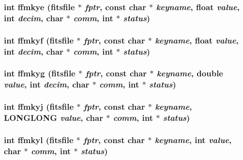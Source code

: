 \subsubsection{\setlength{\rightskip}{0pt plus 5cm}int ffmkye (\bf{fitsfile} $\ast$ {\em fptr}, const char $\ast$ {\em keyname}, float {\em value}, int {\em decim}, char $\ast$ {\em comm}, int $\ast$ {\em status})}\label{fitsio_8h_84fa2097111d3805d61b197d7a00ee78}


\subsubsection{\setlength{\rightskip}{0pt plus 5cm}int ffmkyf (\bf{fitsfile} $\ast$ {\em fptr}, const char $\ast$ {\em keyname}, float {\em value}, int {\em decim}, char $\ast$ {\em comm}, int $\ast$ {\em status})}\label{fitsio_8h_a6e96904c21b62c82a78f38a345e7b39}


\subsubsection{\setlength{\rightskip}{0pt plus 5cm}int ffmkyg (\bf{fitsfile} $\ast$ {\em fptr}, const char $\ast$ {\em keyname}, double {\em value}, int {\em decim}, char $\ast$ {\em comm}, int $\ast$ {\em status})}\label{fitsio_8h_cfca16506886068b451f7a977934509b}


\subsubsection{\setlength{\rightskip}{0pt plus 5cm}int ffmkyj (\bf{fitsfile} $\ast$ {\em fptr}, const char $\ast$ {\em keyname}, \bf{LONGLONG} {\em value}, char $\ast$ {\em comm}, int $\ast$ {\em status})}\label{fitsio_8h_9337d5f08bcd5c82afc87256596ded23}


\subsubsection{\setlength{\rightskip}{0pt plus 5cm}int ffmkyl (\bf{fitsfile} $\ast$ {\em fptr}, const char $\ast$ {\em keyname}, int {\em value}, char $\ast$ {\em comm}, int $\ast$ {\em status})}\label{fitsio_8h_b0edcf1260c7df986e19da627da36ee1}


